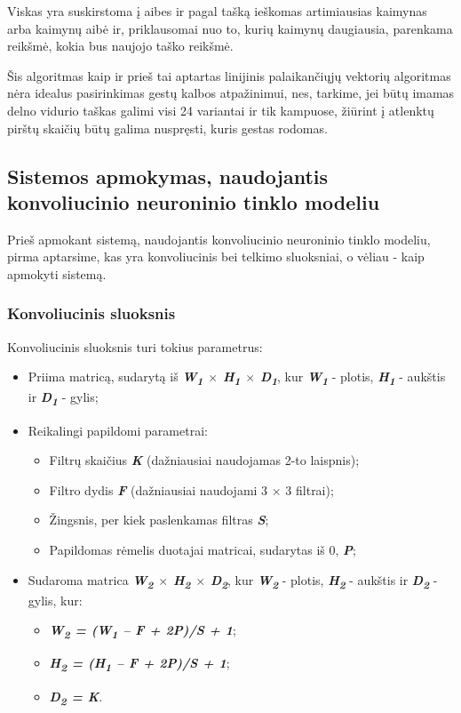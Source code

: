 \documentclass{VUMIFInfKursinis}
\begin{document}
Viskas yra suskirstoma į aibes ir pagal tašką ieškomas artimiausias kaimynas arba kaimynų aibė ir, priklausomai nuo to, kurių kaimynų daugiausia, parenkama reikšmė, kokia bus naujojo taško reikšmė.

Šis algoritmas kaip ir prieš tai aptartas linijinis palaikančiųjų vektorių algoritmas nėra idealus pasirinkimas gestų kalbos atpažinimui, nes, tarkime, jei būtų imamas delno vidurio taškas galimi visi 24 variantai ir tik kampuose, žiūrint į atlenktų pirštų skaičių būtų galima nuspręsti, kuris gestas rodomas.


\subsection{Sistemos apmokymas, naudojantis konvoliucinio neuroninio tinklo modeliu}

Prieš apmokant sistemą, naudojantis konvoliucinio neuroninio tinklo modeliu, pirma aptarsime, kas yra konvoliucinis bei telkimo sluoksniai, o vėliau - kaip apmokyti sistemą.

\subsubsection{Konvoliucinis sluoksnis}

Konvoliucinis sluoksnis turi tokius parametrus:
\begin{itemize}
	\item Priima matricą, sudarytą iš \textit{\textbf{W\textsubscript{1} $\times$ H\textsubscript{1} $\times$ D\textsubscript{1}}}, kur \textit{\textbf{W\textsubscript{1}}} - plotis, \textit{\textbf{H\textsubscript{1}}} - aukštis ir \textit{\textbf{D\textsubscript{1}}} - gylis;
	\item Reikalingi papildomi parametrai:
		\begin{itemize}
			\item Filtrų skaičius \textbf{\textit{K}} (dažniausiai naudojamas 2-to laispnis);
			\item Filtro dydis \textbf{\textit{F}} (dažniausiai naudojami 3 $\times$ 3 filtrai);
			\item Žingsnis, per kiek paslenkamas filtras \textbf{\textit{S}};
			\item Papildomas rėmelis duotajai matricai, sudarytas iš 0, \textbf{\textit{P}};
		\end{itemize}
	\item Sudaroma matrica \textit{\textbf{W\textsubscript{2} $\times$ H\textsubscript{2} $\times$ D\textsubscript{2}}}, kur \textit{\textbf{W\textsubscript{2}}} - plotis, \textit{\textbf{H\textsubscript{2}}} - aukštis ir \textit{\textbf{D\textsubscript{2}}} - gylis, kur:
		\begin{itemize}
			\item \textit{\textbf{W\textsubscript{2} = (W\textsubscript{1} – F + 2P)/S + 1}};
			\item \textit{\textbf{H\textsubscript{2} = (H\textsubscript{1} – F + 2P)/S + 1}};
			\item \textit{\textbf{D\textsubscript{2} = K}}.
		\end{itemize}
\end{itemize}
\end{document}
